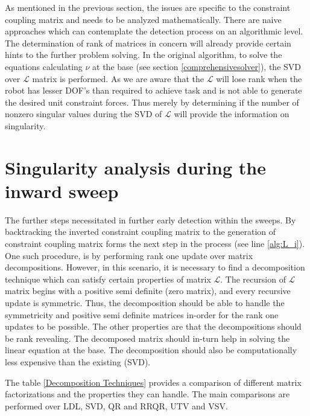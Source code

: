 As mentioned in the previous section, the issues are specific to the constraint coupling matrix and needs to be analyzed mathematically. There are naive approaches which can contemplate the detection process on an algorithmic level. The determination of rank of matrices in concern will already provide certain hints to the further problem solving. In the original algorithm, to solve the equations calculating $\nu$ at the base (see section \ref{comprehensivesolver}), the SVD over $\mathcal{L}$ matrix is performed. As we are aware that the $\mathcal{L}$ will lose rank when the robot has lesser DOF's than required to achieve task and is not able to generate the desired unit constraint forces. Thus merely by determining if the number of nonzero singular values during the SVD of $\mathcal{L}$ will provide the information on singularity. 

\section{Singularity analysis during the inward sweep}
The further steps necessitated in further early detection within the sweeps. By backtracking the inverted constraint coupling matrix to the generation of constraint coupling matrix forms the next step in the process (see line \ref{alg:L_i}). One such procedure, is by performing rank one update over matrix decompositions. However, in this scenario, it is necessary to find a decomposition technique which can satisfy certain properties of matrix $\mathcal{L}$. The recursion of $\mathcal{L}$ matrix begins with a positive semi definite (zero matrix), and every recursive update is symmetric. Thus, the decomposition should be able to handle the symmetricity and positive semi definite matrices in-order for the rank one updates to be possible. The other properties are that the decompositions should be rank revealing. The decomposed matrix should in-turn help in solving the linear equation at the base. The decomposition should also be computationally less expensive than the existing (SVD). 

The table \ref{Decomposition Techniques} provides a comparison of different matrix factorizations and the properties they can handle. The main comparisons are performed over LDL, SVD, QR and RRQR, UTV and VSV. 


